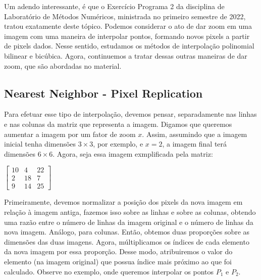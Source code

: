 \documentclass[a4paper, 12pt]{article}
\begin{document}
Um adendo interessante, é que o Exercício Programa 2 da disciplina de Laboratório de Métodos Numéricos, ministrada no primeiro semestre de 2022, tratou exatamente deste tópico.
Podemos considerar o ato de dar zoom em uma imagem com uma maneira de interpolar pontos, formando novos pixels a partir de pixels dados. Nesse sentido, estudamos os métodos de interpolação 
polinomial bilinear e bicúbica. Agora, continuemos a tratar dessas outras maneiras de dar zoom, que são abordadas no material.
\\

\subsection{Nearest Neighbor - Pixel Replication}
Para efetuar esse tipo de interpolação, devemos pensar, separadamente nas linhas e nas colunas da matriz que representa a imagem. Digamos que queremos 
aumentar a imagem por um fator de zoom $x$. Assim, assumindo que a imagem inicial tenha dimensões $3 \times 3$, por exemplo, e $x = 2$, a imagem final terá dimensões $6 \times 6$.
Agora, seja essa imagem exmplificada pela matriz:
\begin{table}[!htbp]
\centering
$
\begin{bmatrix}
	10 & 4 & 22 \\
	2 & 18 & 7 \\
	9 & 14 & 25
\end{bmatrix}
$
\end{table}

Primeiramente, devemos normalizar a posição dos pixels da nova imagem em relação à imagem antiga, fazemos isso sobre as linhas e sobre as colunas, obtendo uma razão entre 
o número de linhas da imagem original e o número de linhas da nova imagem. Análogo, para colunas. Então, obtemos duas proporções sobre as dimensões das duas imagens. 
Agora, múltiplicamos os índices de cada elemento da nova imagem por essa proporção. Desse modo, atribuiremos o valor do elemento (na imagem original) que possua índice mais próximo ao que 
foi calculado. Observe no exemplo, onde queremos interpolar os pontos $P_1$ e $P_2$.
\end{document}
